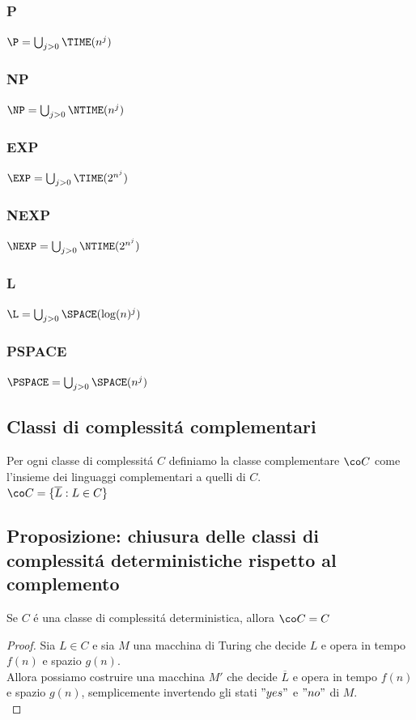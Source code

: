\subsubsection{P}
$\P = \bigcup_{j>0} \TIME(n^j)$

\subsubsection{NP}
$\NP = \bigcup_{j>0} \NTIME(n^j)$

\subsubsection{EXP}
$\EXP = \bigcup_{j>0} \TIME(2^{n^j})$

\subsubsection{NEXP}
$\NEXP = \bigcup_{j>0} \NTIME(2^{n^j})$

\subsubsection{L}
$\L = \bigcup_{j>0} \SPACE(\log(n)^j)$

\subsubsection{PSPACE}
$\PSPACE = \bigcup_{j>0} \SPACE(n^j)$

\subsection{Classi di complessitá complementari}
Per ogni classe di complessitá $C$ definiamo la classe complementare $\co C$ come l'insieme dei linguaggi complementari a quelli di $C$. \\
$\co C = \{ \overline{L} : L \in C \}$

\subsection{Proposizione: chiusura delle classi di complessitá deterministiche rispetto al complemento}
Se $C$ é una classe di complessitá deterministica, allora $\co C = C$ \\
\begin{proof}
Sia $L \in C$ e sia $M$ una macchina di Turing che decide $L$ e opera in tempo $f(n)$ e spazio $g(n)$. \\
Allora possiamo costruire una macchina $M'$ che decide $\overline{L}$ e opera in tempo $f(n)$ e spazio $g(n)$, semplicemente invertendo gli stati $"yes"$ e $"no"$  di $M$. \\
\end{proof}


